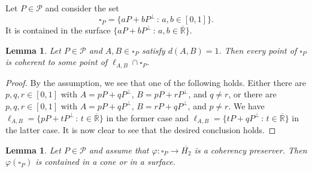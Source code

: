 \documentclass[10pt,a4paper]{amsart}
\providecommand{\index}[1]{}
\newcommand\oH{{\overline{H_2}}}
\newcommand\oR{{\overline{\mathbb{R}}}}
\newtheorem{lemma}[theorem]{Lemma}
\theoremstyle{definition}
\theoremstyle{remark}
\numberwithin{subsection}{section}
\numberwithin{equation}{section}
\begin{document}
Let $P \in \mathcal{P}$ and consider the set
\begin{equation}\label{sp}\index{$\square_P$}
{\square}_P = \{ a P + b P^\perp \, : \, a,b \in [0,1] \}.
\end{equation}
It is contained in the surface $\{ a P + b P^\perp \, : \, a,b \in {\oR} \}$.


\begin{lemma}\label{segment}
Let $P \in \mathcal{P}$ and $A, B\in {\square}_P$ satisfy $d(A, B)=1$. 
Then every point of ${\square}_P$ is coherent to some point of $\ell_{A, B} \cap {\square}_P$. 
\end{lemma}
\begin{proof}
By the assumption, we see that one of the following holds. 
Either there are $p,q,r\in [0,1]$ with $A=pP+qP^\perp$, $B=pP+rP^\perp$, and $q\neq r$, or there are $p,q,r\in [0,1]$ with $A=pP+qP^\perp$, $B=rP+qP^\perp$, and $p\neq r$. 
We have $\ell_{A, B}=\{pP+tP^\perp\,:\, t\in {\oR}\}$ in the former case and $\ell_{A, B}=\{tP+qP^\perp\,:\, t\in {\oR}\}$ in the latter case. 
It is now clear to see that the desired conclusion holds.
\end{proof}



\begin{lemma}\label{where}
Let $P \in \mathcal{P}$ and assume that $\varphi \colon {\square}_P \to \oH$ is a coherency preserver. Then $\varphi ({\square}_P)$ is contained in a cone or in a surface.
\end{lemma}
\end{document}
